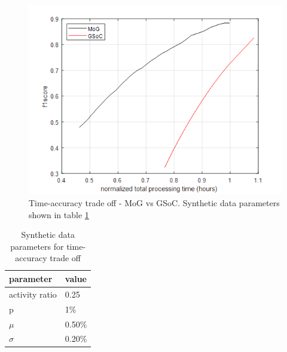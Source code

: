 \begin{figure}
    \centering
    \includegraphics[width=\linewidth]{images/time-acc-tradeoff-mog_vs_gsoc.png}
    \caption[Time-accuracy trade off - MoG vs GSoC]{Time-accuracy trade off - MoG vs GSoC. Synthetic data parameters shown in table \ref{table:fig1_data_params}}
    \label{fig:time-acc-tradeoff-mog_vs_gsoc}
\end{figure}

\begin{table}
\centering
\caption{Synthetic data parameters for time-accuracy trade off} \vspace{5pt}
\label{table:fig1_data_params}
\begin{tabular}{|l|l|}
\hline
parameter             & value  \\ \hline \hline
activity ratio        & 0.25   \\
p                     & 1\%    \\ 
$\mu$    & 0.50\% \\ 
$\sigma$ & 0.20\% \\ \hline
\end{tabular}
\end{table}

